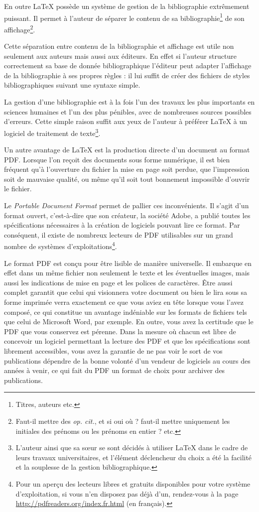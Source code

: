 En outre \LaTeX{} possède un système de gestion de la bibliographie extrêmement puissant. Il permet à l'auteur de séparer le contenu de sa bibliographie\footnote{Titres, auteurs etc.} de son affichage\footnote{Faut-il mettre des \emph{op. cit.}, et si oui où ? faut-il mettre uniquement les initiales des prénoms ou les prénoms en entier ? etc.}.

Cette séparation entre contenu de la bibliographie et affichage est utile non seulement aux auteurs mais aussi aux éditeurs. En effet si l'auteur structure correctement sa base de donnée bibliographique l'éditeur peut adapter l'affichage de la bibliographie à ses propres règles : il lui suffit de créer des fichiers de styles bibliographiques suivant une syntaxe simple.

La gestion d'une bibliographie est à la fois l'un des travaux les plus importants en sciences humaines et l'un des plus pénibles, avec de nombreuses sources possibles d'erreurs. Cette simple raison suffit aux yeux de l'auteur à préférer \LaTeX{} à un logiciel de traitement de texte\footnote{L'auteur ainsi que sa sœur se sont décidés à utiliser \LaTeX{} dans le cadre de leurs travaux universitaires, et l'élément déclencheur du choix a été la facilité et la souplesse de la gestion bibliographique.}.

Un autre avantage de \LaTeX{} est la production directe d'un document au format PDF. Lorsque l'on reçoit des documents sous forme numérique, il est bien fréquent qu'à l'ouverture du fichier la mise en page soit perdue, que l'impression soit de mauvaise qualité, ou même qu'il soit tout bonnement impossible d'ouvrir le fichier.

Le \emph{\textenglish{Portable Document Format}} permet de pallier ces inconvénients. Il s'agit d'un format ouvert, c'est-à-dire que son créateur, la société Adobe, a publié toutes les spécifications nécessaires à la création de logiciels pouvant lire ce format. Par conséquent, il existe de nombreux lecteurs de PDF utilisables sur un grand nombre de systèmes d'exploitations\footnote{Pour un aperçu des lecteurs libres et gratuits disponibles pour votre système d'exploitation, si vous n'en disposez pas déjà d'un, rendez-vous à la page \url{http://pdfreaders.org/index.fr.html} (en français).}.

Le format PDF est conçu pour être lisible de manière universelle. Il embarque en effet dans un même fichier non seulement le texte et les éventuelles images, mais aussi les indications de mise en page et les polices de caractères. Être aussi complet  garantit que celui qui visionnera votre document ou bien le lira sous sa forme imprimée verra exactement ce que vous aviez en tête lorsque vous l'avez composé, ce qui constitue un avantage indéniable sur les formats de fichiers tels que celui de Microsoft Word, par exemple. En outre, vous avez la certitude que le PDF que vous conservez est pérenne. Dans la mesure où chacun est libre de concevoir un logiciel permettant la lecture des PDF et que les spécifications sont librement accessibles, vous avez la garantie de ne pas voir le sort de vos publications dépendre de la bonne volonté d'un vendeur de logiciels au cours des années à venir, ce qui fait du PDF un format de choix pour archiver des publications.

